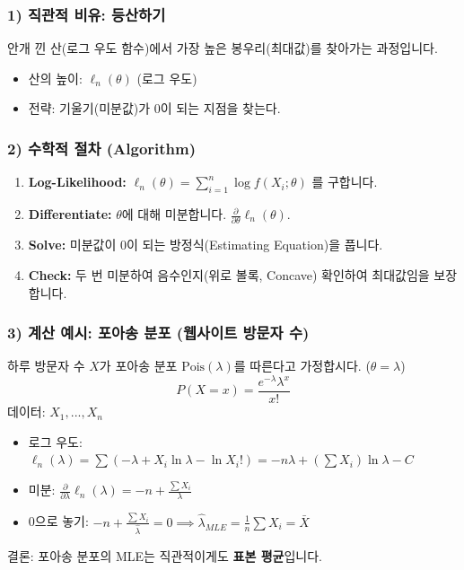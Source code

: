 \documentclass[11pt,a4paper]{book}
\theoremstyle{definition}
\begin{document}
\subsubsection*{1) 직관적 비유: 등산하기}
안개 낀 산(로그 우도 함수)에서 가장 높은 봉우리(최대값)를 찾아가는 과정입니다.
\begin{itemize}
    \item 산의 높이: $\ell_n(\theta)$ (로그 우도)
    \item 전략: 기울기(미분값)가 0이 되는 지점을 찾는다.
\end{itemize}

\subsubsection*{2) 수학적 절차 (Algorithm)}
\begin{enumerate}
    \item \textbf{Log-Likelihood:} $\ell_n(\theta) = \sum_{i=1}^n \log f(X_i; \theta)$ 를 구합니다.
    \item \textbf{Differentiate:} $\theta$에 대해 미분합니다. $\frac{\partial}{\partial \theta} \ell_n(\theta)$.
    \item \textbf{Solve:} 미분값이 0이 되는 방정식(Estimating Equation)을 풉니다.
    \item \textbf{Check:} 두 번 미분하여 음수인지(위로 볼록, Concave) 확인하여 최대값임을 보장합니다.
\end{enumerate}

\subsubsection*{3) 계산 예시: 포아송 분포 (웹사이트 방문자 수)}
하루 방문자 수 $X$가 포아송 분포 $\text{Pois}(\lambda)$를 따른다고 가정합시다. ($\theta = \lambda$)
$$ P(X=x) = \frac{e^{-\lambda}\lambda^x}{x!} $$
데이터: $X_1, ..., X_n$
\begin{itemize}
    \item 로그 우도: $\ell_n(\lambda) = \sum (- \lambda + X_i \ln \lambda - \ln X_i!) = -n\lambda + (\sum X_i)\ln\lambda - C$
    \item 미분: $\frac{\partial}{\partial \lambda} \ell_n(\lambda) = -n + \frac{\sum X_i}{\lambda}$
    \item 0으로 놓기: $-n + \frac{\sum X_i}{\hat{\lambda}} = 0 \implies \hat{\lambda}_{MLE} = \frac{1}{n}\sum X_i = \bar{X}$
\end{itemize}
결론: 포아송 분포의 MLE는 직관적이게도 \textbf{표본 평균}입니다.
\end{document}
